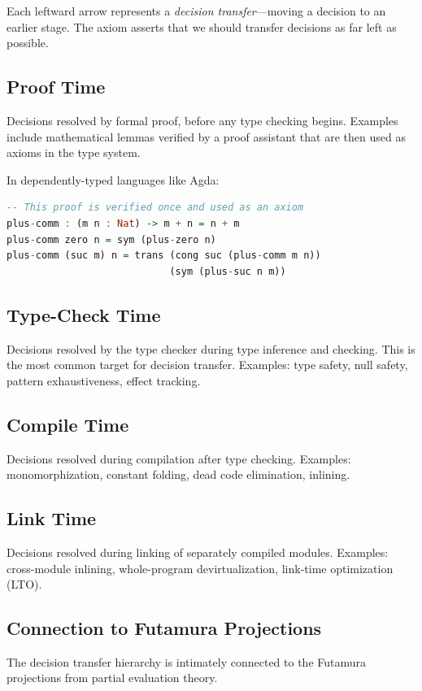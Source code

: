 \documentclass[11pt]{article}
\begin{document}
Each leftward arrow represents a \emph{decision transfer}---moving a decision to an
earlier stage. The axiom asserts that we should transfer decisions as far left as
possible.

\subsection{Proof Time}
Decisions resolved by formal proof, before any type checking begins. Examples include
mathematical lemmas verified by a proof assistant that are then used as axioms in the
type system.

In dependently-typed languages like Agda:
\begin{lstlisting}[language=Haskell, caption={Proof-time decision: commutativity of addition}]
-- This proof is verified once and used as an axiom
plus-comm : (m n : Nat) -> m + n = n + m
plus-comm zero n = sym (plus-zero n)
plus-comm (suc m) n = trans (cong suc (plus-comm m n))
                            (sym (plus-suc n m))
\end{lstlisting}

\subsection{Type-Check Time}
Decisions resolved by the type checker during type inference and checking. This is the
most common target for decision transfer. Examples: type safety, null safety, pattern
exhaustiveness, effect tracking.

\subsection{Compile Time}
Decisions resolved during compilation after type checking. Examples: monomorphization,
constant folding, dead code elimination, inlining.

\subsection{Link Time}
Decisions resolved during linking of separately compiled modules. Examples:
cross-module inlining, whole-program devirtualization, link-time optimization (LTO).

\subsection{Connection to Futamura Projections}

The decision transfer hierarchy is intimately connected to the Futamura projections
from partial evaluation theory.
\end{document}
